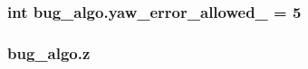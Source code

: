 \subsubsection[{\texorpdfstring{yaw\+\_\+error\+\_\+allowed\+\_\+}{yaw_error_allowed_}}]{\setlength{\rightskip}{0pt plus 5cm}int bug\+\_\+algo.\+yaw\+\_\+error\+\_\+allowed\+\_\+ = 5}\hypertarget{namespacebug__algo_a3714c955ff3cf688c84d6dc5654833d6}{}\label{namespacebug__algo_a3714c955ff3cf688c84d6dc5654833d6}
\subsubsection[{\texorpdfstring{z}{z}}]{\setlength{\rightskip}{0pt plus 5cm}bug\+\_\+algo.\+z}\hypertarget{namespacebug__algo_ad9944dcf5037184fbfbe3162935d2a57}{}\label{namespacebug__algo_ad9944dcf5037184fbfbe3162935d2a57}
